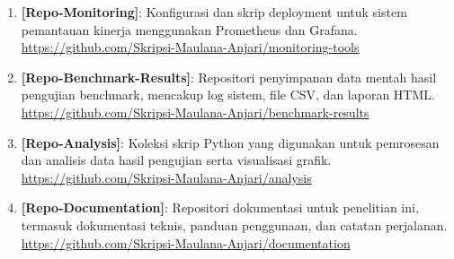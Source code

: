 \begin{enumerate}
    \item \textbf{[Repo-Monitoring]}: Konfigurasi dan skrip deployment untuk sistem pemantauan kinerja menggunakan Prometheus dan Grafana.\\
    \url{https://github.com/Skripsi-Maulana-Anjari/monitoring-tools}

    \item \textbf{[Repo-Benchmark-Results]}: Repositori penyimpanan data mentah hasil pengujian benchmark, mencakup log sistem, file CSV, dan laporan HTML.\\
    \url{https://github.com/Skripsi-Maulana-Anjari/benchmark-results}

    \item \textbf{[Repo-Analysis]}: Koleksi skrip Python yang digunakan untuk pemrosesan dan analisis data hasil pengujian serta visualisasi grafik.\\
    \url{https://github.com/Skripsi-Maulana-Anjari/analysis}

    \item \textbf{[Repo-Documentation]}: Repositori dokumentasi untuk penelitian ini, termasuk dokumentasi teknis, panduan penggunaan, dan catatan perjalanan.\\
    \url{https://github.com/Skripsi-Maulana-Anjari/documentation}
\end{enumerate}
